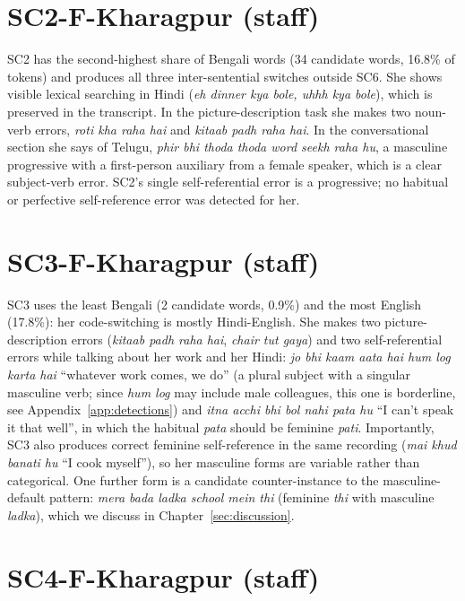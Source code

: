 \documentclass[11pt,a4paper]{report}
\begin{document}
\section{SC2-F-Kharagpur (staff)}

SC2 has the second-highest share of Bengali words (34 candidate words, 16.8\% of tokens) and produces all three inter-sentential switches outside SC6. She shows visible lexical searching in Hindi (\textit{eh dinner kya bole, uhhh kya bole}), which is preserved in the transcript. In the picture-description task she makes two noun-verb errors, \textit{roti kha raha hai} and \textit{kitaab padh raha hai}. In the conversational section she says of Telugu, \textit{phir bhi thoda thoda word seekh raha hu}, a masculine progressive with a first-person auxiliary from a female speaker, which is a clear subject-verb error. SC2's single self-referential error is a progressive; no habitual or perfective self-reference error was detected for her.

\section{SC3-F-Kharagpur (staff)}

SC3 uses the least Bengali (2 candidate words, 0.9\%) and the most English (17.8\%): her code-switching is mostly Hindi-English. She makes two picture-description errors (\textit{kitaab padh raha hai}, \textit{chair tut gaya}) and two self-referential errors while talking about her work and her Hindi: \textit{jo bhi kaam aata hai hum log karta hai} ``whatever work comes, we do'' (a plural subject with a singular masculine verb; since \textit{hum log} may include male colleagues, this one is borderline, see Appendix~\ref{app:detections}) and \textit{itna acchi bhi bol nahi pata hu} ``I can't speak it that well'', in which the habitual \textit{pata} should be feminine \textit{pati}. Importantly, SC3 also produces correct feminine self-reference in the same recording (\textit{mai khud banati hu} ``I cook myself''), so her masculine forms are variable rather than categorical. One further form is a candidate counter-instance to the masculine-default pattern: \textit{mera bada ladka school mein thi} (feminine \textit{thi} with masculine \textit{ladka}), which we discuss in Chapter~\ref{sec:discussion}.

\section{SC4-F-Kharagpur (staff)}
\end{document}
